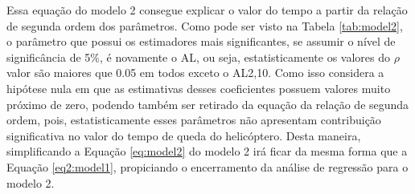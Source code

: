 Essa equação do modelo 2 consegue explicar o valor do tempo a partir da relação de segunda ordem dos parâmetros. Como pode ser visto na Tabela \ref{tab:model2}, o parâmetro que possui os estimadores mais significantes, se assumir o nível de significância de 5\%, é novamente o AL, ou seja, estatisticamente os valores do $\rho$ valor são maiores que 0.05 em todos exceto o AL2,10. Como isso considera a hipótese nula em que as estimativas desses coeficientes possuem valores muito próximo de zero, podendo também ser retirado da equação da relação de segunda ordem, pois, estatisticamente esses parâmetros não apresentam contribuição significativa no valor do tempo de queda do helicóptero. Desta maneira, simplificando a Equação \ref{eq:model2} do modelo 2 irá ficar da mesma forma que a Equação \ref{eq2:model1}, propiciando o encerramento da análise de regressão para o modelo 2.
